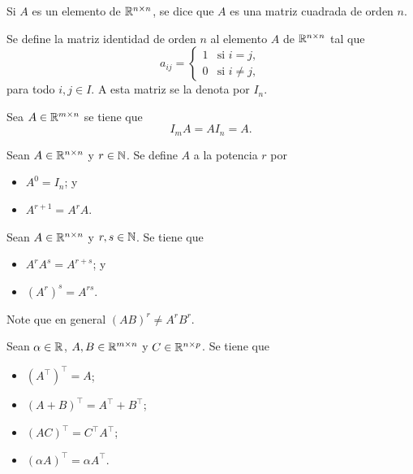 \documentclass[a4,11pt]{aleph-notas}
\begin{document}
\begin{defi}
    Si $A$ es un elemento de $\R^{n \times n}$, se dice que $A$ es una matriz cuadrada de orden $n$. 
\end{defi}

\begin{defi}
    Se define la matriz identidad de orden $n$ al elemento $A$ de $\R^{n \times n}$ tal que
    \[
        a_{ij} =
            \begin{cases}
            1 & \text{si } i=j, \\
            0 & \text{si } i \neq j,
            \end{cases}
    \]
    para todo $i,j\in I$. A esta matriz se la denota por $I_n$.
\end{defi} 

\begin{prop}
    Sea $A\in\Mat[\R]{m}{n}$ se tiene que
    \[ 
        I_m A = A I_n = A.
    \]
\end{prop}

\begin{defi}
    Sean $A \in \R^{n \times n}$ y $r\in\N$. Se define $A$ a la potencia $r$ por
    \begin{itemize}
    \item 
        $A^0 = I_n$; y
    \item 
        $A^{r+1} = A^rA$.
    \end{itemize}
\end{defi}

\begin{teo}
    Sean $A \in \R^{n \times n}$ y $r,s\in\N$. Se tiene que
    \begin{itemize}
    \item 
        $A^r A^s = A^{r+s}$; y 
    \item 
        $(A^r)^s = A^{rs}$.
    \end{itemize}
\end{teo}

\begin{advertencia}
    Note que en general $(AB)^r \neq A^r B^r$.
\end{advertencia}


\begin{teo}
    Sean $\alpha \in \R$, $A,B\in\R^{m \times n}$ y  $C\in\R^{n \times p}$. Se tiene que
    \begin{itemize}
    \item 
        $\left(A^\intercal\right)^\intercal = A$;
    \item 
        $(A+B)^\intercal = A^\intercal + B^\intercal$;
    \item 
        $(AC)^\intercal = C^\intercal A^\intercal$;
    \item 
        $(\alpha A)^\intercal = \alpha A^\intercal$.
    \end{itemize}
\end{teo}
\end{document}
